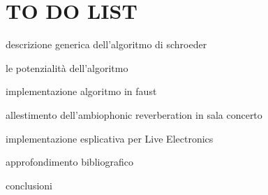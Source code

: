 \newcommand{\mylanguages}{italian,english} %
\newcommand{\mytitle}{Ambiophonic Reverberation}
\newcommand{\mysubtitle}{For a more accessible and less technical introduction
                         to this topic, \\ see Introduction to General Relativity}
\newcommand{\authorone}{Paradisi Francesco}
\newcommand{\institutione}{Conservatorio S. Cecilia di Roma}
\newcommand{\emailone}{francesco.paradisi10 @ gmail.com}
\newcommand{\authortwo}{Giuseppe Silvi}
\newcommand{\institutiontwo}{Conservatorio Nicolini di Bari}
\newcommand{\emailtwo}{silvi.giuseppe @ docenticonsba.it} %
\newcommand{\authorthree}{Edoardo Staffa}
\newcommand{\institutionthree}{Conservatorio S. Cecilia di Roma}
\newcommand{\emailthree}{edoardo.staffa1 @ gmail.com} %


\maketitle
\thispagestyle{empty}

\section*{TO DO LIST}

\begin{compactitem}
\item descrizione generica dell'algoritmo di schroeder
\item le potenzialità dell'algoritmo
\item implementazione algoritmo in faust
\item allestimento dell'ambiophonic reverberation in sala concerto
\item implementazione esplicativa per Live Electronics
\item approfondimento bibliografico
\item conclusioni
\item
\item
\end{compactitem}



